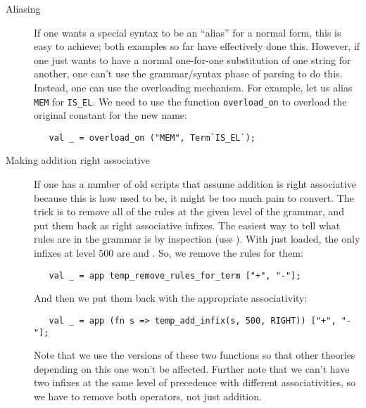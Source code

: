 \begin{description}

\item[Aliasing] If one wants a special syntax to be an ``alias'' for a
  normal \HOL{} form, this is easy to achieve; both examples so far
  have effectively done this.  However, if one just wants to have a
  normal one-for-one substitution of one string for another, one can't
  use the grammar/syntax phase of parsing to do this.  Instead, one
  can use the overloading mechanism.  For example, let us alias
  \texttt{MEM} for \texttt{IS\_EL}.  We need to use the function
  \texttt{overload\_on} to overload the original constant for the new
  name:
\begin{verbatim}
   val _ = overload_on ("MEM", Term`IS_EL`);
\end{verbatim}

\item[Making addition right associative] If one has a number of old
  scripts that assume addition is right associative because this is
  how \HOL{} used to be, it might be too much pain to convert.  The trick
  is to remove all of the rules at the given level of the grammar, and
  put them back as right associative infixes.  The easiest way to tell
  what rules are in the grammar is by inspection (use
  ).  With just 
  loaded, the only infixes at level 500 are \holtxt{+} and
  \holtxt{-}.  So, we remove the rules for them:
\begin{verbatim}
   val _ = app temp_remove_rules_for_term ["+", "-"];
\end{verbatim}
  \noindent And then we put them back with the appropriate
  associativity:
\begin{verbatim}
   val _ = app (fn s => temp_add_infix(s, 500, RIGHT)) ["+", "-"];
\end{verbatim}
\noindent Note that we use the  versions of these two
functions so that other theories depending on this one won't be
affected.  Further note that we can't have two infixes at the same
level of precedence with different associativities, so we have to
remove both operators, not just addition.


\end{description}

